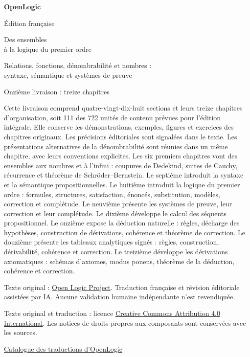 \documentclass[11pt,a4paper,openany]{memoir}
\begin{document}
\frontmatter
\begin{titlingpage}
\setlength{\parindent}{0pt}
\vspace*{15mm}
{\sffamily\Huge\bfseries OpenLogic\par}
\vspace{6mm}
{\sffamily\LARGE Édition française\par}
\vspace{14mm}
{\sffamily\huge Des ensembles\\à la logique du premier ordre\par}
\vspace{5mm}
{\large Relations, fonctions, dénombrabilité et nombres :\\
syntaxe, sémantique et systèmes de preuve\par}
\vfill
{\large Onzième livraison : treize chapitres\par}
\vspace{4mm}
Cette livraison comprend quatre-vingt-dix-huit sections et leurs treize chapitres d’organisation,
soit 111 des 722 unités de contenu prévues pour l’édition intégrale.
Elle conserve les démonstrations, exemples, figures et exercices
des chapitres originaux. Les précisions éditoriales sont signalées
dans le texte. Les présentations alternatives de la dénombrabilité
sont réunies dans un même chapitre, avec leurs conventions explicites.
Les six premiers chapitres vont des ensembles aux nombres et à l’infini :
coupures de Dedekind, suites de Cauchy, récurrence et théorème de
Schröder--Bernstein. Le septième introduit la syntaxe et la sémantique
propositionnelles. Le huitième introduit la logique du premier ordre :
formules, structures, satisfaction, énoncés, substitution, modèles,
correction et complétude. Le neuvième présente les systèmes de preuve,
leur correction et leur complétude. Le dixième développe le calcul
des séquents propositionnel. Le onzième expose la déduction naturelle :
règles, décharge des hypothèses, construction de dérivations,
cohérence et théorème de correction. Le douzième présente les tableaux
analytiques signés : règles, construction, dérivabilité, cohérence et
correction. Le treizième développe les dérivations axiomatiques :
schémas d’axiomes, modus ponens, théorème de la déduction, cohérence
et correction.
\vspace{7mm}
\par\small
Texte original : \href{https://openlogicproject.org/}{Open Logic Project}.
Traduction française et révision éditoriale assistées par IA.
Aucune validation humaine indépendante n'est revendiquée.
\par\medskip
Texte original et traduction : licence
\href{https://creativecommons.org/licenses/by/4.0/}{Creative Commons
Attribution 4.0 International}. Les notices de droits propres aux
composants sont conservées avec les sources.
\par\medskip
\href{https://kokunoyumeto.github.io/OpenLogic-translations/}{Catalogue
des traductions d'OpenLogic}
\end{titlingpage}
\tableofcontents*
\mainmatter
\end{document}
